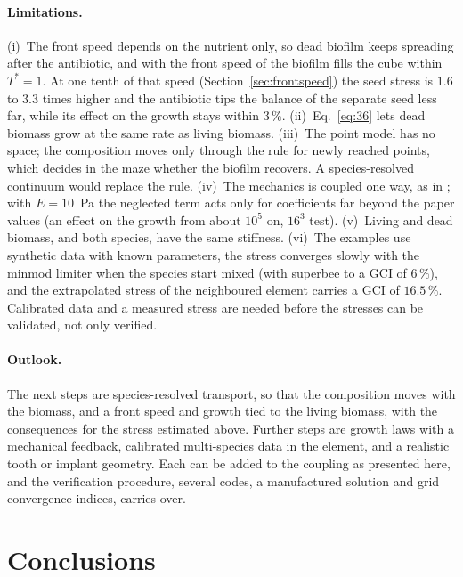 \documentclass[11pt,a4paper]{article}
\begin{document}
\paragraph{Limitations.} (i)~The front speed depends on the nutrient only, so dead biofilm keeps spreading after the antibiotic, and with the front speed of \citet{Klempt2024DiffusionDrivenGrowth} the biofilm fills the cube within $T^*=1$. At one tenth of that speed (Section~\ref{sec:frontspeed}) the seed stress is $1.6$ to $3.3$ times higher and the antibiotic tips the balance of the separate seed less far, while its effect on the growth stays within $3\,\%$. (ii)~Eq.~\eqref{eq:36} lets dead biomass grow at the same rate as living biomass. (iii)~The point model has no space; the composition moves only through the rule for newly reached points, which decides in the maze whether the biofilm recovers. A species-resolved continuum would replace the rule. (iv)~The mechanics is coupled one way, as in \citet{Klempt2024DiffusionDrivenGrowth}; with $E=10$~Pa the neglected term acts only for coefficients far beyond the paper values (an effect on the growth from about $10^5$ on, $16^3$ test). (v)~Living and dead biomass, and both species, have the same stiffness. (vi)~The examples use synthetic data with known parameters, the stress converges slowly with the minmod limiter when the species start mixed (with superbee to a GCI of $6\,\%$), and the extrapolated stress of the neighboured element carries a GCI of $16.5\,\%$. Calibrated data \citep[for example the five-species data of][]{Heine2025PeriImplant} and a measured stress are needed before the stresses can be validated, not only verified.

\paragraph{Outlook.} The next steps are species-resolved transport, so that the composition moves with the biomass, and a front speed and growth tied to the living biomass, with the consequences for the stress estimated above. Further steps are growth laws with a mechanical feedback, calibrated multi-species data in the element, and a realistic tooth or implant geometry. Each can be added to the coupling as presented here, and the verification procedure, several codes, a manufactured solution and grid convergence indices, carries over.

\section{Conclusions}
\label{sec:conclusions}
\end{document}
